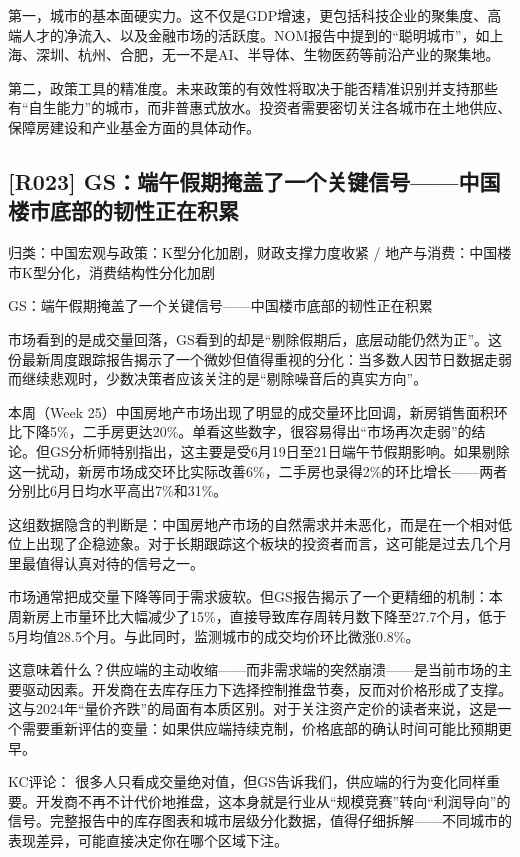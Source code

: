 \documentclass[11pt]{ctexart}
\begin{document}
第一，城市的基本面硬实力。这不仅是GDP增速，更包括科技企业的聚集度、高端人才的净流入、以及金融市场的活跃度。NOM报告中提到的“聪明城市”，如上海、深圳、杭州、合肥，无一不是AI、半导体、生物医药等前沿产业的聚集地。

第二，政策工具的精准度。未来政策的有效性将取决于能否精准识别并支持那些有“自生能力”的城市，而非普惠式放水。投资者需要密切关注各城市在土地供应、保障房建设和产业基金方面的具体动作。

\subsection{[R023] GS：端午假期掩盖了一个关键信号——中国楼市底部的韧性正在积累}
{\small\color{refgray}归类：中国宏观与政策：K型分化加剧，财政支撑力度收紧 / 地产与消费：中国楼市K型分化，消费结构性分化加剧}

GS：端午假期掩盖了一个关键信号——中国楼市底部的韧性正在积累

市场看到的是成交量回落，GS看到的却是“剔除假期后，底层动能仍然为正”。这份最新周度跟踪报告揭示了一个微妙但值得重视的分化：当多数人因节日数据走弱而继续悲观时，少数决策者应该关注的是“剔除噪音后的真实方向”。

本周（Week 25）中国房地产市场出现了明显的成交量环比回调，新房销售面积环比下降5\%，二手房更达20\%。单看这些数字，很容易得出“市场再次走弱”的结论。但GS分析师特别指出，这主要是受6月19日至21日端午节假期影响。如果剔除这一扰动，新房市场成交环比实际改善6\%，二手房也录得2\%的环比增长——两者分别比6月日均水平高出7\%和31\%。

这组数据隐含的判断是：中国房地产市场的自然需求并未恶化，而是在一个相对低位上出现了企稳迹象。对于长期跟踪这个板块的投资者而言，这可能是过去几个月里最值得认真对待的信号之一。

市场通常把成交量下降等同于需求疲软。但GS报告揭示了一个更精细的机制：本周新房上市量环比大幅减少了15\%，直接导致库存周转月数下降至27.7个月，低于5月均值28.5个月。与此同时，监测城市的成交均价环比微涨0.8\%。

这意味着什么？供应端的主动收缩——而非需求端的突然崩溃——是当前市场的主要驱动因素。开发商在去库存压力下选择控制推盘节奏，反而对价格形成了支撑。这与2024年“量价齐跌”的局面有本质区别。对于关注资产定价的读者来说，这是一个需要重新评估的变量：如果供应端持续克制，价格底部的确认时间可能比预期更早。

KC评论： 很多人只看成交量绝对值，但GS告诉我们，供应端的行为变化同样重要。开发商不再不计代价地推盘，这本身就是行业从“规模竞赛”转向“利润导向”的信号。完整报告中的库存图表和城市层级分化数据，值得仔细拆解——不同城市的表现差异，可能直接决定你在哪个区域下注。
\end{document}
